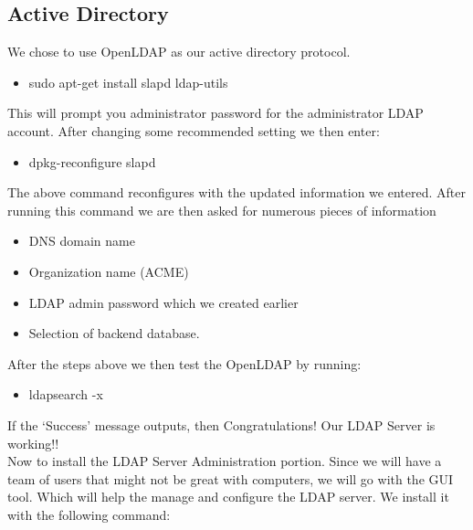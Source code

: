
\subsection{Active Directory}
We chose to use OpenLDAP as our active directory protocol.

\begin{itemize}
	
	\item sudo apt-get install slapd ldap-utils
	
\end{itemize}

\noindent This will prompt you administrator password for the administrator LDAP 
account.
After changing some recommended setting we then enter:

\begin{itemize}
	\item dpkg-reconfigure slapd
\end{itemize}

\noindent The above command reconfigures with the updated information we entered. After 
running this command we are then asked for numerous pieces of information

\begin{itemize}
	\item DNS domain name
	\item Organization name (ACME)
	\item LDAP admin password which we created earlier
	\item Selection of backend database. 
\end{itemize}

\noindent After the steps above we then test the OpenLDAP by running:

\begin{itemize}
	\item ldapsearch -x
\end{itemize}

\noindent If the ‘Success’ message outputs, then Congratulations! Our LDAP 
Server is working!! \\

\noindent Now to install the LDAP Server Administration portion. Since we will 
have a team of users that might not be great with computers, we will go with
the GUI tool. Which will help the manage and configure the LDAP server.
We install it with the following command:

